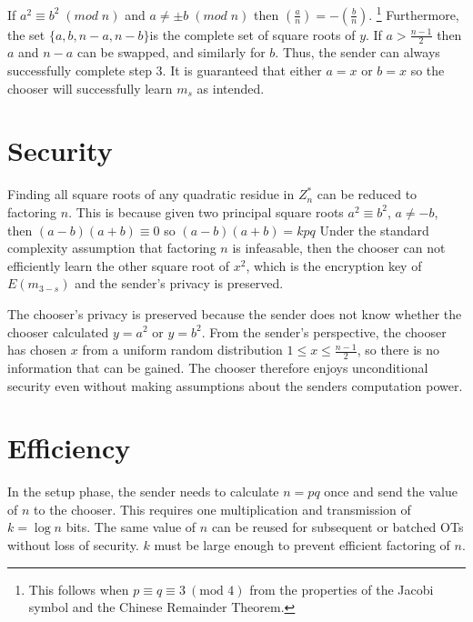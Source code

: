 If $a^{2}\equiv b^{2}\;(mod\; n)$ and $a\neq\pm b\;(mod\; n)$ then
$\left(\frac{a}{n}\right)=-\left(\frac{b}{n}\right)$.%
\footnote{This follows when $p\equiv q\equiv3\ (\mbox{mod 4})$ from the properties
of the Jacobi symbol and the Chinese Remainder Theorem.%
} Furthermore, the set $\{a,b,n-a,n-b\}$is the complete set of square
roots of $y$. If $a>\frac{n-1}{2}$ then $a$ and $n-a$ can be swapped,
and similarly for $b$. Thus, the sender can always successfully complete
step 3. It is guaranteed that either $a=x$ or $b=x$ so the chooser
will successfully learn $m_{s}$ as intended.


\section{Security}

Finding all square roots of any quadratic residue in $Z_{n}^{*}$
can be reduced to factoring $n$. This is because given two principal
square roots $a^{2}\equiv b^{2}$, $a\neq-b$, then $(a-b)(a+b)\equiv0$
so $(a-b)(a+b)=kpq$ Under the standard complexity assumption that
factoring $n$ is infeasable, then the chooser can not efficiently
learn the other square root of $x^{2}$, which is the encryption key
of $E(m_{3-s})$ and the sender's privacy is preserved. 

The chooser's privacy is preserved because the sender does not know
whether the chooser calculated $y=a^{2}$ or $y=b^{2}$. From the
sender's perspective, the chooser has chosen $x$ from a uniform random
distribution $1\le x\le\frac{n-1}{2}$, so there is no information
that can be gained. The chooser therefore enjoys unconditional security
even without making assumptions about the senders computation power.


\section{Efficiency}

In the setup phase, the sender needs to calculate $n=pq$ once and
send the value of $n$ to the chooser. This requires one multiplication
and transmission of $k=\log n$ bits. The same value of $n$ can be
reused for subsequent or batched OTs without loss of security. $k$
must be large enough to prevent efficient factoring of $n$.

